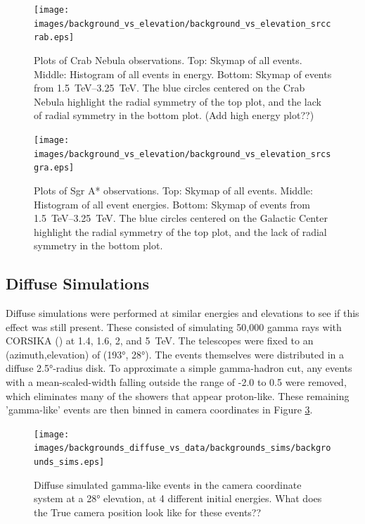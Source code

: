   \begin{figure}[ht]
    \centering
    \texttt{[image: images/background\_vs\_elevation/background\_vs\_elevation\_srccrab.eps]}
    \caption[Background Vs Elevation Crab]
    {\small 
      Plots of Crab Nebula observations.
      Top: Skymap of all events.
      Middle: Histogram of all events in energy.
      Bottom: Skymap of events from \SIrange{1.5}{3.25}{\TeV}.  
      The blue circles centered on the Crab Nebula highlight the radial symmetry of the top plot, and the lack of radial symmetry in the bottom plot.
      {\color{red}(Add high energy plot??)}
    }
    \label{fig:bkgvsel_crab}
  \end{figure}

  \begin{figure}[ht]
    \centering
    \texttt{[image: images/background\_vs\_elevation/background\_vs\_elevation\_srcsgra.eps]}
    \caption[Background Vs Elevation Sgr A*]
    {\small 
      Plots of Sgr A* observations.
      Top: Skymap of all events.
      Middle: Histogram of all event energies.
      Bottom: Skymap of events from \SIrange{1.5}{3.25}{\TeV}.  
      The blue circles centered on the Galactic Center highlight the radial symmetry of the top plot, and the lack of radial symmetry in the bottom plot.
    }
    \label{fig:bkgvsel_sgra}
  \end{figure}
  
  \FloatBarrier

  \subsection{Diffuse Simulations}\label{subsubsec:diffusesims}
    Diffuse simulations were performed at similar energies and elevations to see if this effect was still present.
    These consisted of simulating 50,000 gamma rays with CORSIKA (\cite{corsika1998}) at 1.4, 1.6, 2, and \SI{5}{\TeV}.
    The telescopes were fixed to an (azimuth,elevation) of (\ang{193}, \ang{28}).
    The events themselves were distributed in a diffuse \ang{2.5}-radius disk.
    To approximate a simple gamma-hadron cut, any events with a mean-scaled-width falling outside the range of -2.0 to 0.5 were removed, which eliminates many of the showers that appear proton-like.
    These remaining 'gamma-like' events are then binned in camera coordinates in Figure \ref{fig:back_simdiffuse}.

    \begin{figure}[ht]
      \centering
      \texttt{[image: images/backgrounds\_diffuse\_vs\_data/backgrounds\_sims/backgrounds\_sims.eps]}
      \caption[Diffuse Simulated Backgrounds]{
        Diffuse simulated gamma-like events in the camera coordinate system at a \ang{28} elevation, at 4 different initial energies.
        {\color{red}What does the True camera position look like for these events??}
      }
      \label{fig:back_simdiffuse}
    \end{figure}

